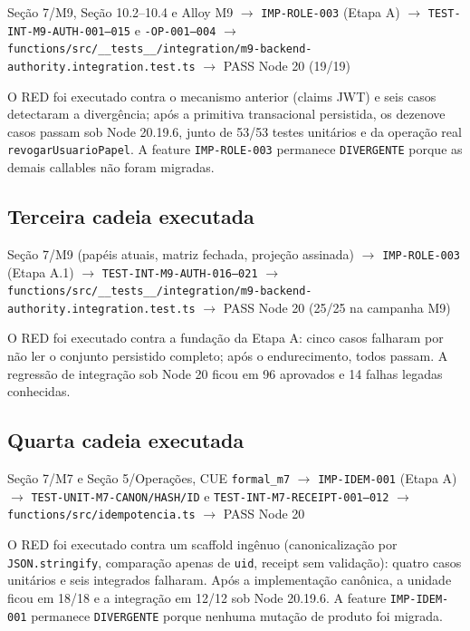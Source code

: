\begin{center}
Seção 7/M9, Seção 10.2--10.4 e Alloy M9
$\rightarrow$ \texttt{IMP-ROLE-003} (Etapa A)
$\rightarrow$ \texttt{TEST-INT-M9-AUTH-001--015} e \texttt{-OP-001--004}
$\rightarrow$ \nolinkurl{functions/src/__tests__/integration/m9-backend-authority.integration.test.ts}
$\rightarrow$ PASS Node 20 (19/19)
\end{center}

O RED foi executado contra o mecanismo anterior (claims JWT) e seis casos
detectaram a divergência; após a primitiva transacional persistida, os dezenove
casos passam sob Node 20.19.6, junto de 53/53 testes unitários e da operação
real \texttt{revogarUsuarioPapel}. A feature \texttt{IMP-ROLE-003} permanece
\texttt{DIVERGENTE} porque as demais callables não foram migradas.

\subsection{Terceira cadeia executada}

\begin{center}
Seção 7/M9 (papéis atuais, matriz fechada, projeção assinada)
$\rightarrow$ \texttt{IMP-ROLE-003} (Etapa A.1)
$\rightarrow$ \texttt{TEST-INT-M9-AUTH-016--021}
$\rightarrow$ \nolinkurl{functions/src/__tests__/integration/m9-backend-authority.integration.test.ts}
$\rightarrow$ PASS Node 20 (25/25 na campanha M9)
\end{center}

O RED foi executado contra a fundação da Etapa A: cinco casos falharam por não
ler o conjunto persistido completo; após o endurecimento, todos passam. A
regressão de integração sob Node 20 ficou em 96 aprovados e 14 falhas legadas
conhecidas.

\subsection{Quarta cadeia executada}

\begin{center}
Seção 7/M7 e Seção 5/Operações, CUE \texttt{formal\_m7}
$\rightarrow$ \texttt{IMP-IDEM-001} (Etapa A)
$\rightarrow$ \texttt{TEST-UNIT-M7-CANON/HASH/ID} e \texttt{TEST-INT-M7-RECEIPT-001--012}
$\rightarrow$ \nolinkurl{functions/src/idempotencia.ts}
$\rightarrow$ PASS Node 20
\end{center}

O RED foi executado contra um scaffold ingênuo (canonicalização por
\texttt{JSON.stringify}, comparação apenas de \texttt{uid}, receipt sem
validação): quatro casos unitários e seis integrados falharam. Após a
implementação canônica, a unidade ficou em 18/18 e a integração em 12/12 sob
Node 20.19.6. A feature \texttt{IMP-IDEM-001} permanece \texttt{DIVERGENTE}
porque nenhuma mutação de produto foi migrada.

